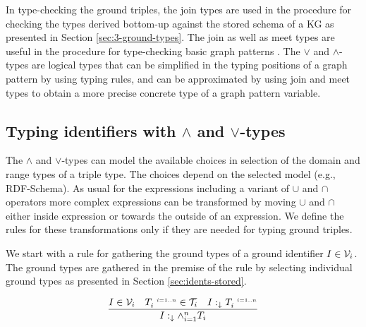 \documentclass[runningheads]{llncs}
\newcommand{\s}{\scriptscriptstyle\ \,}
\newcommand{\darr}{\downarrow}
\newcommand{\V}{{\cal V}}
\newcommand{\T}{{\cal T}}
\newcommand{\memo}[1]{}
\begin{document}
In type-checking the ground triples, the join types are used in the
procedure for checking the types derived bottom-up against the stored
schema of a KG as presented in Section \ref{sec:3-ground-types}. The
join as well as meet types are useful in the procedure for
type-checking basic graph patterns \cite{Savnik2025a}. The $\lor$ and
$\land$-types are logical types that can be simplified in the typing
positions of a graph pattern by using typing rules, and can be
approximated by using join and meet types to obtain a more precise
concrete type of a graph pattern variable.




\subsection{Typing identifiers with $\land$ and $\lor$-types}

The $\land$ and $\lor$-types can model the available choices in
selection of the domain and range types of a triple type. The choices
depend on the selected model (e.g., RDF-Schema). As usual for the
expressions including a variant of $\cup$ and $\cap$ operators more
complex expressions can be transformed by moving $\cup$ and $\cap$
either inside expression or towards the outside of an expression. We
define the rules for these transformations only if they are needed for
typing ground triples.

We start with a rule for gathering the ground types of a ground
identifier $I\in\V_i$. The ground types are gathered in the premise of
the rule by selecting individual ground types as presented in Section
\ref{sec:idents-stored}.

\begin{equation}
\label{rul:land-1}
\dfrac{I\in\V_i\quad\/T_i^{\s\/i=1..n}\in\T_i\quad\/I:_{\darr}T_i^{\s\/i=1..n}}
      {I:_{\darr}\land_{i=1}^n\/T_i}
\end{equation}

\memo{
Let's have a look at $\land$-type composed of $I$'s ground types
$T_i^{\s\/i=1..n}$ in the case $I\in\V_i$. In Yago \cite{Hoffart2013},
often $I$ has a set of very specific classes $T_s$ but also some
general classes $C_g$. The general classes $C_g$ are close to the
classes used in the schema triple types. If stored typing of $V$ is
correct, then $C_g$ includes the classes that are supertypes of
classes from $C_s$.}
\end{document}
